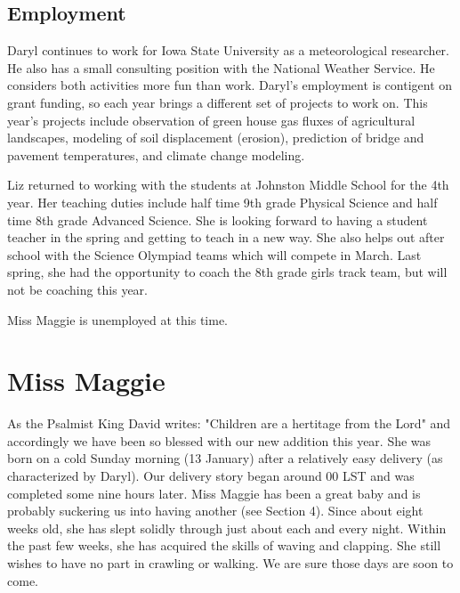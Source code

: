 \documentclass{article}
\begin{document}
\begin{multicols}{2}
\subsection{Employment}
Daryl continues to work for Iowa State University as a meteorological 
researcher.  He also has a small consulting position with the National
Weather Service.  He considers both activities more fun than work.  Daryl's
employment is contigent on grant funding, so each year brings a different
set of projects to work on.  This year's projects include observation of
green house gas fluxes of agricultural landscapes, modeling of soil
displacement (erosion), prediction of bridge and pavement temperatures, and
climate change modeling.

Liz returned to working with the students at Johnston Middle School for the
4th year.  Her teaching duties include half time 9th grade Physical Science
and half time 8th grade Advanced Science.  She is looking forward to having
a student teacher in the spring and getting to teach in a new way.  She
also helps out after school with the Science Olympiad teams which will
compete in March.  Last spring, she had the opportunity to coach the 8th
grade girls track team, but will not be coaching this year.

Miss Maggie is unemployed at this time. 

\section{Miss Maggie}

As the Psalmist King David writes: "Children are a hertitage from the Lord"
and accordingly we have been so blessed with our new addition this year.  She was born on
a cold Sunday morning (13 January) after a relatively easy delivery (as 
characterized by Daryl).  Our delivery story began around 00 LST and was 
completed some nine hours later.  Miss Maggie has been a great baby and 
is probably suckering us into having another (see Section 4). Since about eight weeks old,
she has slept solidly through just about each and every night.  Within the
past few weeks, she has acquired the skills of waving and clapping.  She
still wishes to have no part in crawling or walking.  We are sure those days
are soon to come.


\end{multicols}
\end{document}
